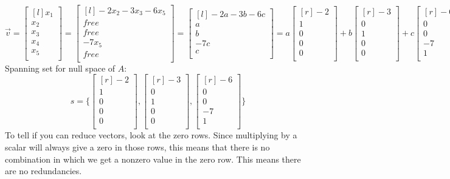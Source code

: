 \documentclass{report}
\theoremstyle{plain}
\theoremstyle{definition}
\theoremstyle{plain}
\begin{document}
\[ \vec{v} = \begin{bmatrix}[l] x_1\\x_2\\x_3\\x_4\\x_5\\ \end{bmatrix} = \begin{bmatrix}[l] -2x_2-3x_3-6x_5\\ free\\ free\\ -7x_5\\ free\\ \end{bmatrix} = \begin{bmatrix}[l] -2a-3b-6c\\a\\b\\-7c\\c\\ \end{bmatrix} = a\begin{bmatrix}[r]-2\\1\\0\\0\\0\\ \end{bmatrix}+b\begin{bmatrix}[r]-3\\0\\1\\0\\0\\ \end{bmatrix} + c\begin{bmatrix}[r]-6\\0\\0\\-7\\1\\ \end{bmatrix}\]
Spanning set for null space of $A$:
\[ s= \{\begin{bmatrix}[r]-2\\1\\0\\0\\0\\ \end{bmatrix}, \begin{bmatrix}[r]-3\\0\\1\\0\\0\\ \end{bmatrix},\begin{bmatrix}[r]-6\\0\\0\\-7\\1\\ \end{bmatrix} \} \]
To tell if you can reduce vectors, look at the zero rows. Since multiplying by a scalar will always give a zero in those rows, this means that there is no combination in which we get a nonzero value in the zero row. This means there are no redundancies. 
\end{document}
